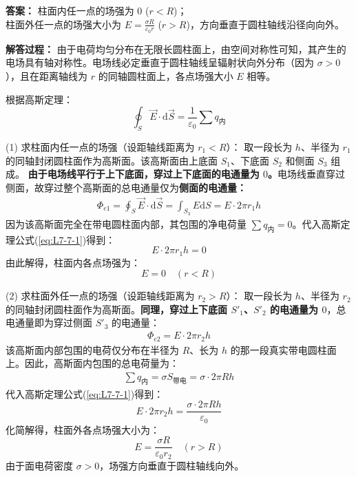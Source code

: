 \begin{enumerate}
	\setcounter{equation}{0}
	\renewcommand{\theHequation}{L7-7.\arabic{equation}}
	
	\textbf{答案： }
	柱面内任一点的场强为 $0$ ($r < R$)；\\
	柱面外任一点的场强大小为 $E = \frac{\sigma R}{\varepsilon_0 r}$ ($r > R$)，方向垂直于圆柱轴线沿径向向外。
	
	\textbf{解答过程： }
	由于电荷均匀分布在无限长圆柱面上，由空间对称性可知，其产生的电场具有轴对称性。电场线必定垂直于圆柱轴线呈辐射状向外分布（因为 $\sigma > 0$），且在距离轴线为 $r$ 的同轴圆柱面上，各点场强大小 $E$ 相等。
	
	根据高斯定理：
	\begin{equation}\label{eq:L7-7-1}
		\oint_S \vec{E} \cdot \mathrm{d}\vec{S} = \frac{1}{\varepsilon_0} \sum q_{\text{内}}
	\end{equation}
	
	(1) 求柱面内任一点的场强（设距轴线距离为 $r_1 < R$）：
	取一段长为 $h$、半径为 $r_1$ 的同轴封闭圆柱面作为高斯面。该高斯面由上底面 $S_1$、下底面 $S_2$ 和侧面 $S_3$ 组成。
	\textbf{由于电场线平行于上下底面，穿过上下底面的电通量为 $0$。}电场线垂直穿过侧面，故穿过整个高斯面的总电通量仅为\textbf{侧面的电通量：}
	\begin{align*}
		\Phi_{e1} = \oint_{S} \vec{E} \cdot \mathrm{d}\vec{S} = \int_{S_3} E \mathrm{d}S = E \cdot 2\pi r_1 h
	\end{align*}
	因为该高斯面完全在带电圆柱面内部，其包围的净电荷量 $\sum q_{\text{内}} = 0$。代入高斯定理公式(\ref{eq:L7-7-1})得到：
	\begin{equation}\label{eq:L7-7-2}
		E \cdot 2\pi r_1 h = 0
	\end{equation}
	由此解得，柱面内各点场强为：
	\begin{equation}\label{eq:L7-7-3}
		E = 0 \quad (r < R)
	\end{equation}
	
	(2) 求柱面外任一点的场强（设距轴线距离为 $r_2 > R$）：
	取一段长为 $h$、半径为 $r_2$ 的同轴封闭圆柱面作为高斯面。\textbf{同理，穿过上下底面 $S'_1$、$S'_2$ 的电通量为 $0$}，总电通量即为穿过侧面 $S'_3$ 的电通量：
	\begin{align*}
		\Phi_{e2} = E \cdot 2\pi r_2 h
	\end{align*}
	该高斯面内部包围的电荷仅分布在半径为 $R$、长为 $h$ 的那一段真实带电圆柱面上。因此，高斯面内包围的总电荷量为：
	\begin{align*}
		\sum q_{\text{内}} = \sigma S_{\text{带电}} = \sigma \cdot 2\pi R h
	\end{align*}
	代入高斯定理公式(\ref{eq:L7-7-1})得到：
	\begin{equation}\label{eq:L7-7-4}
		E \cdot 2\pi r_2 h = \frac{\sigma \cdot 2\pi R h}{\varepsilon_0}
	\end{equation}
	化简解得，柱面外各点场强大小为：
	\begin{equation}\label{eq:L7-7-5}
		E = \frac{\sigma R}{\varepsilon_0 r_2} \quad (r > R)
	\end{equation}
	由于面电荷密度 $\sigma > 0$，场强方向垂直于圆柱轴线向外。
	

\end{enumerate}
